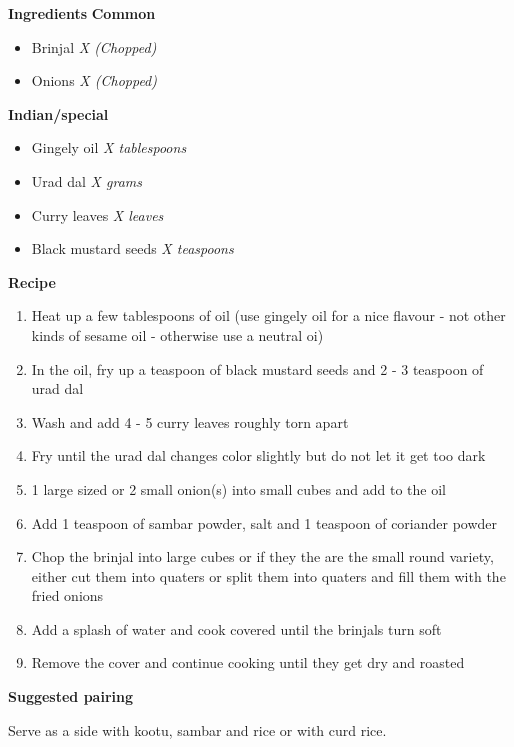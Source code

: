 
\large{\textbf{Ingredients}}
  \large{\textbf{Common}}
  \begin{itemize}
    \item Brinjal \quad\quad\quad\quad \textit{X (Chopped)}
    \item Onions \quad\quad\quad\quad \textit{X (Chopped)}
  \end{itemize}
  \large{\textbf{Indian/special}}
  \begin{itemize}
    \item Gingely oil \quad\quad\quad\quad \textit{X tablespoons}
    \item Urad dal \quad\quad\quad\quad \textit{X grams}
    \item Curry leaves \quad\quad\quad\quad \textit{X leaves}
    \item Black mustard seeds \quad\quad\quad\quad \textit{X teaspoons}
  \end{itemize}

\large{\textbf{Recipe}}

\begin{enumerate}
  \item Heat up a few tablespoons of oil (use gingely oil for a nice flavour - not other kinds of sesame oil - otherwise use a neutral oi)
  \item In the oil, fry up a teaspoon of black mustard seeds and 2 - 3 teaspoon of urad dal
  \item Wash and add 4 - 5 curry leaves roughly torn apart
  \item Fry until the urad dal changes color slightly but do not let it get too dark
  \item 1 large sized or 2 small onion(s) into small cubes and add to the oil
  \item Add 1 teaspoon of sambar powder, salt and 1 teaspoon of coriander powder
  \item Chop the brinjal into large cubes or if they the are the small round variety, either cut them into quaters or split them into quaters and fill them with the fried onions
  \item Add a splash of water and cook covered until the brinjals turn soft
  \item Remove the cover and continue cooking until they get dry and roasted
\end{enumerate}

\large{\textbf{Suggested pairing}}

Serve as a side with kootu, sambar and rice or with curd rice.
